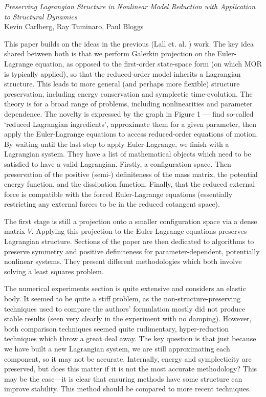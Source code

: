 \documentclass{article}
\begin{document}
\vspace{2cm}

\begin{center}
    \textit{Preserving Lagrangian Structure in Nonlinear Model Reduction with Application to Structural Dynamics} \\
    Kevin Carlberg, Ray Tuminaro, Paul Bloggs \cite{carlberg2015}
\end{center}

This paper builds on the ideas in the previous (Lall et. al. \cite{lall2003}) work. The key idea shared between both is that we perform Galerkin projection on the Euler-Lagrange equation, as opposed to the first-order state-space form (on which MOR is typically applied), so that the reduced-order model inherits a Lagrangian structure. This leads to more general (and perhaps more flexible) structure preservation, including energy conservation and symplectic time-evolution. The theory is for a broad range of problems, including nonlinearities and parameter dependence. The novelty is expressed by the graph in Figure 1 --- find so-called `reduced Lagrangian ingredients', approximate them for a given parameter, then apply the Euler-Lagrange equations to access reduced-order equations of motion. By waiting until the last step to apply Euler-Lagrange, we finish with a Lagrangian system. They have a list of mathematical objects which need to be satisfied to have a valid Lagrangian. Firstly, a configuration space. Then preservation of the positive (semi-) definiteness of the mass matrix, the potential energy function, and the dissipation function. Finally, that the reduced external force is compatible with the forced Euler-Lagrange equations (essentially restricting any external forces to be in the reduced cotangent space). \newline

The first stage is still a projection onto a smaller configuration space via a dense matrix $V$. Applying this projection to the Euler-Lagrange equations preserves Lagrangian structure. Sections of the paper are then dedicated to algorithms to preserve symmetry and positive definiteness for parameter-dependent, potentially nonlinear systems. They present different methodologies which both involve solving a least squares problem. \newline

The numerical experiments section is quite extensive and considers an elastic body. It seemed to be quite a stiff problem, as the non-structure-preserving techniques used to compare the authors' formulation mostly did not produce stable results (seen very clearly in the experiment with no damping). However, both comparison techniques seemed quite rudimentary, hyper-reduction techniques which throw a great deal away. The key question is that just because we have built a new Lagrangian system, we are still approximating each component, so it may not be accurate. Internally, energy and symplecticity are preserved, but does this matter if it is not the most accurate methodology? This may be the case---it is clear that ensuring methods have some structure can improve stability. This method should be compared to more recent techniques.
\end{document}
